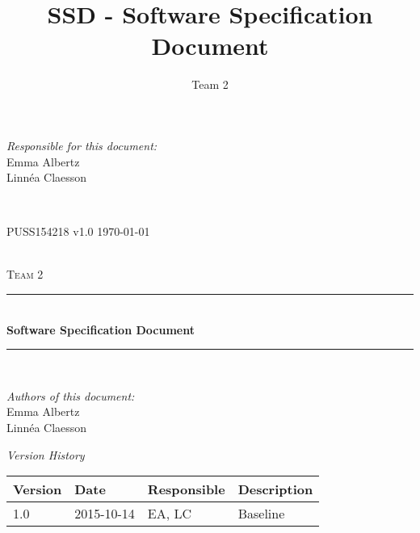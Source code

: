 \documentclass[a4paper]{article}
\title{SSD - Software Specification Document}
\author{Team 2}
\begin{document}
\begin{titlepage}
\newcommand{\HRule}{\rule{\linewidth}{0.5mm}}

\begin{minipage}{0.5\textwidth}
\begin{flushleft} %
\textit{Responsible for this document:}\\
Emma Albertz \\
Linnéa Claesson
\end{flushleft}
\end{minipage}
~
\begin{minipage}{0.4\textwidth}
\begin{flushright}
PUSS154218 v1.0
\today
\end{flushright}
\end{minipage}\\[3cm]

\centering
\textsc{\LARGE Team 2}\\[0.5cm]

\HRule \\[0.4cm]
{ \huge \bfseries Software Specification Document}\\[0.4cm] %
\HRule \\[1.5cm]

\vfill
\begin{flushleft}
\textit{Authors of this document:}\\
Emma Albertz \\
Linnéa Claesson
\end{flushleft}



\end{titlepage}



\begin{center}
\textit{\large Version History}

    \begin{tabular}{ | l | l | l | p{5cm} |}
    \hline
    \textbf{Version} & \textbf{Date} & \textbf{Responsible} & \textbf{Description} \\ \hline
    1.0 & 2015-10-14 & EA, LC & Baseline\\ \hline
    \end{tabular}
\end{center}



\setcounter{tocdepth}{2}
\tableofcontents
\newpage
{}
\end{document}
